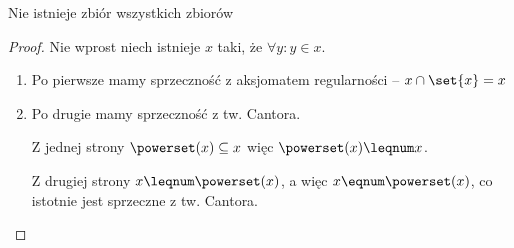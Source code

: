 \begin{theorem}
    Nie istnieje zbiór wszystkich zbiorów
\end{theorem}
\begin{proof}
    Nie wprost niech istnieje \( x \) taki, że \( \forall y: y \in x \).
    \begin{enumerate}
        \item Po pierwsze mamy sprzeczność z aksjomatem regularności -- \( x \cap \set{x} = x \)
        \item Po drugie mamy sprzeczność z tw. Cantora.
        
            Z jednej strony \( \powerset(x) \subseteq x \) więc \( \powerset(x) \leqnum x \).
            
            Z drugiej strony \( x \leqnum \powerset(x) \), a więc \( x \eqnum \powerset(x) \), co istotnie jest sprzeczne z tw. Cantora.
    \end{enumerate}
\end{proof}